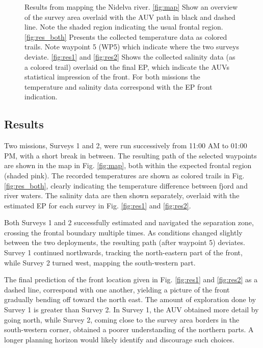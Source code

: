 \documentclass[aoas]{imsart}
\begin{document}
\begin{figure}[!h]
\caption{Results from mapping the Nidelva river. \ref{fig:map} Show an overview of the survey area overlaid with the AUV path in black and dashed line. Note the shaded region indicating the usual frontal region. \ref{fig:res_both} Presents the collected temperature data as colored trails. Note waypoint 5 (WP5) which indicate where the two surveys deviate. \ref{fig:res1} and \ref{fig:res2} Shows the collected salinity data (as a colored trail) overlaid on the final EP, which indicate the AUVs statistical impression of the front. For both missions the temperature and salinity data correspond with the EP front indication.} 
\label{fig:results}
\end{figure}

\subsection{Results}

Two missions, Surveys 1 and 2, were run successively from 11:00 AM to 01:00 PM, with a short break in between. The resulting path of the selected waypoints are shown in the map in Fig. \ref{fig:map}, both within the expected frontal region (shaded pink). The recorded temperatures are shown as colored trails in Fig. \ref{fig:res_both}, clearly indicating the temperature difference between fjord and river waters. The salinity data are then shown separately, overlaid with the estimated EP for each survey in Fig. \ref{fig:res1} and \ref{fig:res2}. 

Both Surveys 1 and 2 successfully estimated and navigated the separation zone, crossing the frontal boundary multiple times. As conditions changed slightly between the two deployments, the resulting path (after waypoint 5) deviates. Survey 1 continued northwards, tracking the north-eastern part of the front, while Survey 2 turned west, mapping the south-western part. 

The final prediction of the front location given in Fig. \ref{fig:res1} and \ref{fig:res2} as a dashed line, correspond with one another, yielding a picture of the front gradually bending off toward the north east. The amount of exploration done by Survey 1 is greater than Survey 2. In Survey 1, the AUV obtained more detail by going north, while Survey 2, coming close to the survey area borders in the south-western corner, obtained a poorer understanding of the northern parts. A longer planning horizon would likely identify and discourage such choices.
\end{document}

